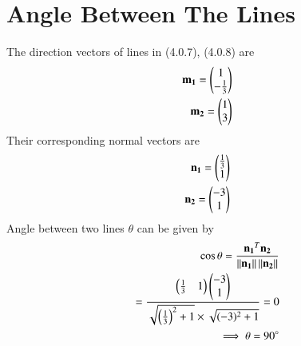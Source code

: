 \documentclass[journal,12pt,twocolumn]{IEEEtran}
\begin{document}
\section{Angle Between The Lines}
The direction vectors of lines in (4.0.7), (4.0.8) are
\begin{align}
    \mathbf{m_1}=\begin{pmatrix}1\\-\frac{1}{3}\end{pmatrix}\\
    \mathbf{m_2}=\begin{pmatrix}1\\3\end{pmatrix}
\end{align}
Their corresponding normal vectors are
\begin{align}
    \mathbf{n_1}=\begin{pmatrix}\frac{1}{3}\\1\end{pmatrix}\\
    \mathbf{n_2}=\begin{pmatrix}-3\\1\end{pmatrix}
\end{align}
Angle between two lines $\theta$ can be given by
\begin{align}
\cos \theta = \frac{\mathbf{n_1}^T\mathbf{n_2}}{\left\lVert\mathbf{n_1}\right\rVert\left\lVert\mathbf{n_2}\right\rVert}\\
=\frac{\begin{pmatrix}\frac{1}{3}&1\end{pmatrix}\begin{pmatrix}-3\\1\end{pmatrix}}{\sqrt{\left(\frac{1}{3}\right)^2 +1} \times \sqrt{(-3)^2 +1}}=0\\
\implies \theta = 90\degree
\end{align}
\end{document}
